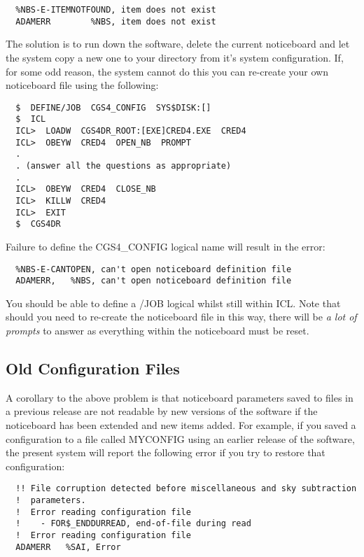 {\begin{verbatim}
  %NBS-E-ITEMNOTFOUND, item does not exist
  ADAMERR        %NBS, item does not exist
\end{verbatim}

The solution is to run down the software, delete the current noticeboard and
let the system copy a new one to your directory from it's system configuration.
If, for some odd reason, the system cannot do this you can re-create your
own noticeboard file using the following:

\begin{verbatim}
  $  DEFINE/JOB  CGS4_CONFIG  SYS$DISK:[]
  $  ICL
  ICL>  LOADW  CGS4DR_ROOT:[EXE]CRED4.EXE  CRED4
  ICL>  OBEYW  CRED4  OPEN_NB  PROMPT
  .
  . (answer all the questions as appropriate)
  .
  ICL>  OBEYW  CRED4  CLOSE_NB
  ICL>  KILLW  CRED4
  ICL>  EXIT
  $  CGS4DR
\end{verbatim}

Failure to define the CGS4\_CONFIG logical name will result in the error:

\begin{verbatim}
  %NBS-E-CANTOPEN, can't open noticeboard definition file
  ADAMERR,   %NBS, can't open noticeboard definition file
\end{verbatim}

You should be able to define a /JOB logical whilst still within ICL.
Note that should you need to re-create the noticeboard file in this
way, there will be {\em a lot of prompts} to answer as everything within
the noticeboard must be reset.

\subsection{Old Configuration Files}
\label{old_configuration_files}

A corollary to the above problem is that noticeboard parameters saved to
files in a previous release are not readable by new versions of the software 
if the noticeboard has been extended and new items added. For example, if you 
saved a configuration to a file called {\sf MYCONFIG} using an earlier release
of the software, the present system will report the following error
if you try to restore that configuration:

\begin{verbatim}
  !! File corruption detected before miscellaneous and sky subtraction
  !  parameters.
  !  Error reading configuration file
  !    - FOR$_ENDDURREAD, end-of-file during read
  !  Error reading configuration file
  ADAMERR   %SAI, Error
\end{verbatim}

}
